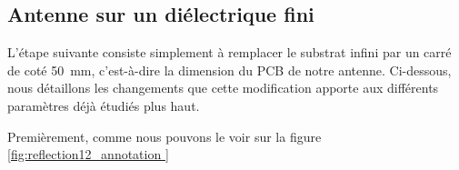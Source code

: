 
\subsection{Antenne sur un diélectrique fini}
L'étape suivante consiste simplement à remplacer le substrat infini par un carré de coté \SI{50}{\milli\meter}, c'est-à-dire la dimension du PCB de notre antenne. Ci-dessous, nous détaillons les changements que cette modification apporte aux différents paramètres déjà étudiés plus haut.

Premièrement, comme nous pouvons le voir sur la figure \ref{fig:reflection12_annotation
}


